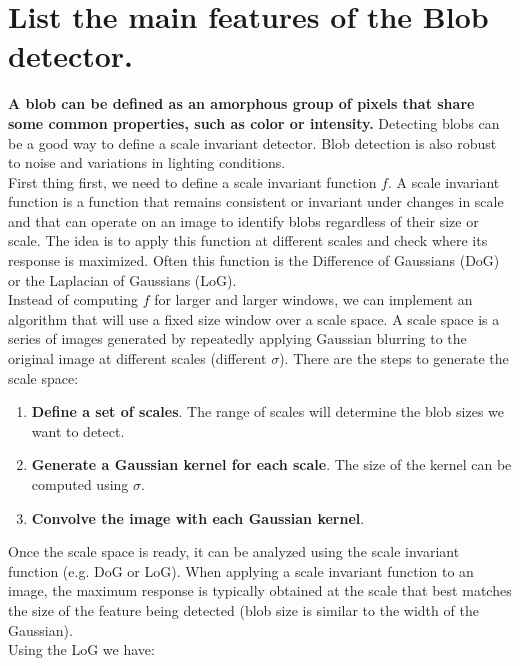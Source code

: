 \documentclass{article}
\begin{document}
\newpage

\section{List the main features of the Blob detector.}

\textbf{A blob can be defined as an amorphous group of pixels that share some common properties, such as color or intensity.} Detecting blobs can be a good way to define a scale invariant detector. Blob detection is also robust to noise and variations in lighting conditions. \\

First thing first, we need to define a scale invariant function $f$. A scale invariant function is a function that remains consistent or invariant under changes in scale and that can operate on an image to identify blobs regardless of their size or scale. The idea is to apply this function at different scales and check where its response is maximized. Often this function is the Difference of Gaussians (DoG) or the Laplacian of Gaussians (LoG). \\ 

Instead of computing $f$ for larger and larger windows, we can implement an algorithm that will use a fixed size window over a scale space. A scale space is a series of images generated by repeatedly applying Gaussian blurring to the original image at different scales (different $\sigma$). There are the steps to generate the scale space:

\begin{enumerate}
    \item \textbf{Define a set of scales}. The range of scales will determine the blob sizes we want to detect.
    \item \textbf{Generate a Gaussian kernel for each scale}. The size of the kernel can be computed using $\sigma$.
    \item \textbf{Convolve the image with each Gaussian kernel}.
\end{enumerate}

Once the scale space is ready, it can be analyzed using the scale invariant function (e.g. DoG or LoG). When applying a scale invariant function to an image, the maximum response is typically obtained at the scale that best matches the size of the feature being detected (blob size is similar to the width of the Gaussian). \\

Using the LoG we have:
\end{document}
